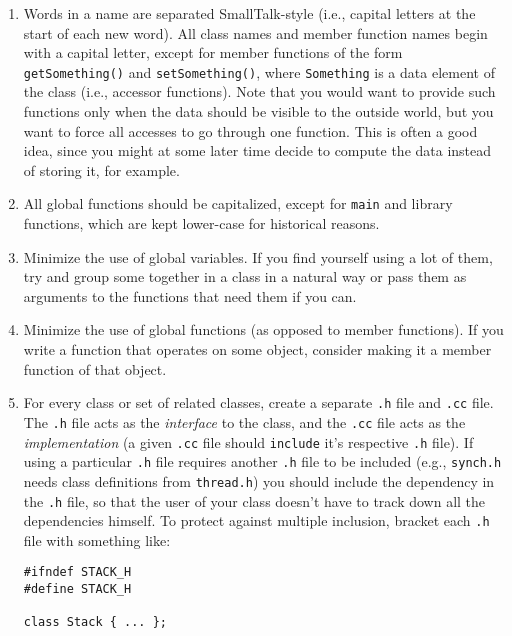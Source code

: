 \begin{enumerate}

\item Words in a name are separated SmallTalk-style (i.e., capital
letters at the start of each new word).  All class names and member
function names begin with a capital letter, except for member
functions of the form {\tt getSomething()} and {\tt setSomething()},
where {\tt Something} is a data element of the class (i.e., accessor
functions).  Note that you would want to provide such functions only
when the data should be visible to the outside world, but you want to
force all accesses to go through one function.  This is often a good
idea, since you might at some later time decide to compute the data
instead of storing it, for example.

\item All global functions should be capitalized,
except for {\tt main} and library
functions, which are kept lower-case for historical reasons.

\item Minimize the use of global variables.  If you find yourself
using a lot of them, try and group some together in a class in a
natural way or pass them as arguments to the functions that need them
if you can.

\item Minimize the use of global functions (as opposed to member
functions).  If you write a function that operates on some object,
consider making it a member function of that object.

\item For every class or set of related classes, create a separate
{\tt .h} file and {\tt .cc} file. The {\tt .h} file acts as the {\it
interface} to the class, and the {\tt .cc} file acts as the
{\it implementation} (a given {\tt .cc} file should {\tt include} it's
respective {\tt .h} file).  If using a particular {\tt .h} file requires
another {\tt .h} file to be included (e.g., {\tt synch.h} needs
class definitions from {\tt thread.h}) you should include the dependency
in the {\tt .h} file, so that the user of your class doesn't have to 
track down all the dependencies himself.  
To protect against multiple inclusion, bracket each {\tt .h}
file with something like:
\begin{verbatim}
#ifndef STACK_H
#define STACK_H

class Stack { ... };


\end{verbatim}
\end{enumerate}

